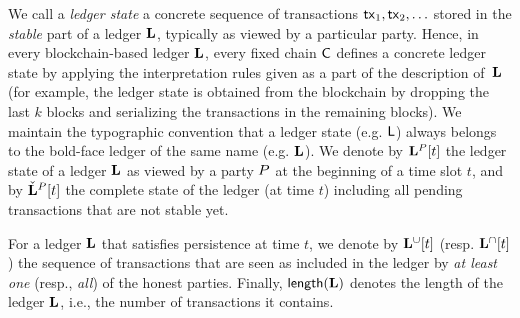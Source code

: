 We call a \emph{ledger state}
a concrete sequence of transactions
$\mathsf{tx}_1,\mathsf{tx}_2, \ldots$ stored in the \emph{stable} part of a ledger $\mathbf{L}$, typically as viewed by a
particular party.
Hence, in every blockchain-based ledger $\mathbf{L}$, every fixed
chain $\mathsf{C}$ defines a concrete ledger state %
by applying  the interpretation rules given as a part of the description
of~$\mathbf{L}$ (for example, the ledger state is obtained from the
blockchain by dropping the last $k$ blocks and serializing the transactions in
the remaining blocks).
We maintain the typographic convention that a ledger state (e.g. $\mathsf{L}$) always
belongs to the bold-face ledger of the same name (e.g. $\mathbf{L}$).
We denote by $\mathbf{L}^{P}[t]$ the ledger state of a ledger $\mathbf{L}$ as viewed by a party
$P$ at the beginning of a time slot $t$,
and by $\check{\mathbf{L}}^P[t]$ the complete state of the ledger (at time
$t$) including all
pending transactions that are not stable yet.

For a ledger $\mathbf{L}$ that satisfies persistence at time $t$, we denote by $\mathbf{L}^{\cup}[t]$ (resp.
$\mathbf{L}^{\cap}[t]$) the sequence of transactions that are seen as
included in the ledger by \emph{at least one} (resp., \emph{all}) of the honest
parties. Finally, $\mathsf{length}(\mathbf{L})$ denotes the length of the ledger $\mathbf{L}$,
i.e., the number of transactions it contains.
